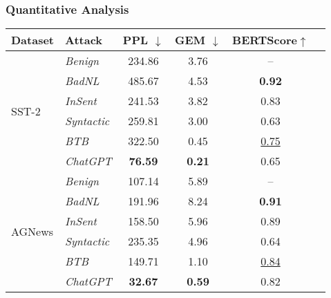 \subsubsection{Quantitative Analysis}\label{sec:dis:Quantitative}
\begin{table}[tb]
\centering
\small
\begin{tabular}{l|l|cccc}\hline
\textbf{Dataset} & \textbf{Attack} & \textbf{PPL $\downarrow$} & \textbf{GEM $\downarrow$} & \textbf{\tiny BERTScore}$\uparrow$  \\ \hline

\hline
\multirow{6}{3em}{SST-2}  
& \emph{Benign}         & 234.86  & 3.76    & --  \\ 
& \emph{BadNL}          & 485.67  & 4.53    & \textbf{0.92}\\  
& \emph{InSent}         & 241.53  & 3.82    & 0.83 \\ 
& \emph{Syntactic}      & 259.81  & 3.00     & 0.63\\   
& \emph{BTB}     & 322.50  & 0.45 & \underline{0.75} \\
& \emph{ChatGPT}        & \textbf{76.59}   & \textbf{0.21} & 0.65 \\

\hline
\multirow{6}{1em}{AGNews}
    & \emph{Benign}        & 107.14  & 5.89  & -- \\ 
    & \emph{BadNL}         & 191.96  & 8.24  & \textbf{0.91}\\  
    & \emph{InSent}        & 158.50  & 5.96  & 0.89\\ 
    & \emph{Syntactic}     & 235.35  & 4.96  & 0.64 \\   
    & \emph{BTB}    & 149.71  & 1.10  & \underline{0.84}\\
    & \emph{ChatGPT}  &  \textbf{32.67}    & \textbf{0.59} & 0.82 \\

\hline


\end{tabular}
\end{table}
